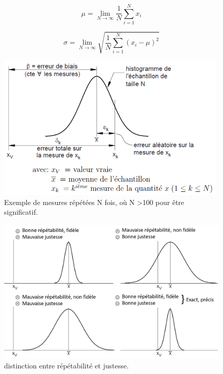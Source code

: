 \begin{equation}
    \mu = \lim\limits_{N \to \infty} \frac{1}{N} \sum_{i=1}^N x_i
\end{equation}

\begin{equation}
    \sigma = \lim\limits_{N \to \infty} \sqrt{\frac{1}{N}\sum_{i=1}^N (x_i-\mu)^2}
\end{equation}

\begin{figure}
    \centering
    \includegraphics[height=7cm]{assets/figures/3_7_Exemple_de_mesures_repetees_N_fois.PNG}
    \caption{Exemple de mesures répétées N fois, où N >100 pour être significatif.}
    \label{fig:Exemple_de_mesures_repetees_N_fois}
\end{figure}

\begin{figure}
    \centering
    \includegraphics[height=7cm]{assets/figures/3_8_distinction_entre_repetabiite_et_justesse.PNG}
    \caption{distinction entre répétabilité et justesse.}
    \label{fig:distinction_entre_repetabiite_et_justesse}
\end{figure}

